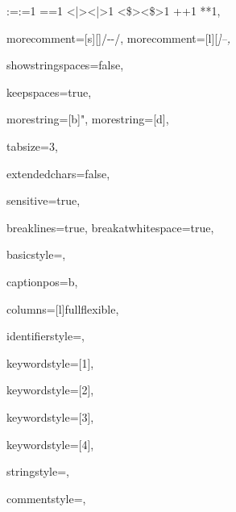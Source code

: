 {{:=}{{\color{symbolcolor}:=}}1
{=}{{\color{symbolcolor}=}}1
{<|>}{{\color{symbolcolor}<|>}}1
{<\$>}{{\color{symbolcolor}<\$>}}1
{+}{{\color{symbolcolor}+}}1
{*}{{\color{symbolcolor}*}}1,

morecomment=[s][\color{commentcolor}]{/-}{-/},
morecomment=[l][\itshape \color{commentcolor}]{--},

showstringspaces=false,

keepspaces=true,

morestring=[b]",
morestring=[d],

tabsize=3,

extendedchars=false,

sensitive=true,

breaklines=true,
breakatwhitespace=true,

basicstyle=\ttfamily\small,

captionpos=b,

columns=[l]fullflexible,


identifierstyle={\ttfamily\color{black}},

keywordstyle=[1]{\ttfamily\color{keywordcolor}},

keywordstyle=[2]{\ttfamily\color{sortcolor}},

keywordstyle=[3]{\ttfamily\color{tacticcolor}},

keywordstyle=[4]{\ttfamily\color{attributecolor}},

stringstyle=\ttfamily,

commentstyle={\ttfamily\footnotesize },

}